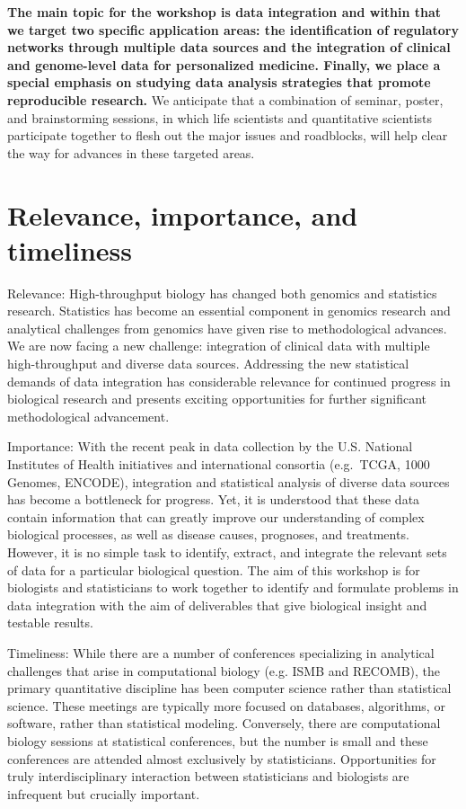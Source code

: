 \documentclass[12pt]{amsart}
\begin{document}
\textbf{The main topic for the workshop is data integration and within
  that we target two specific application areas: the identification of
  regulatory networks through multiple data sources and the
  integration of clinical and genome-level data for personalized
  medicine. Finally, we place a special emphasis on studying data
  analysis strategies that promote reproducible research.} We
anticipate that a combination of seminar, poster, and brainstorming
sessions, in which life scientists and quantitative scientists
participate together to flesh out the major issues and roadblocks,
will help clear the way for advances in these targeted areas.

\section*{Relevance, importance, and timeliness}

Relevance: High-throughput biology has changed both genomics and
statistics research. Statistics has become an essential component in
genomics research and analytical challenges from genomics have given
rise to methodological advances.  We are now facing a new challenge:
integration of clinical data with multiple high-throughput and diverse
data sources. Addressing the new statistical demands of data
integration has considerable relevance for continued progress in
biological research and presents exciting opportunities for further
significant methodological advancement.

Importance: With the recent peak in data collection by the
U.S. National Institutes of Health initiatives and international
consortia (e.g.\ TCGA, 1000 Genomes, ENCODE), integration and
statistical analysis of diverse data sources has become a bottleneck
for progress. Yet, it is understood that these data contain
information that can greatly improve our understanding of complex
biological processes, as well as disease causes, prognoses, and
treatments. However, it is no simple task to identify, extract, and
integrate the relevant sets of data for a particular biological
question. The aim of this workshop is for biologists and statisticians
to work together to identify and formulate problems in data
integration with the aim of deliverables that give biological insight
and testable results.

Timeliness: While there are a number of conferences specializing in
analytical challenges that arise in computational biology (e.g. ISMB
and RECOMB), the primary quantitative discipline has been computer
science rather than statistical science.  These meetings are typically
more focused on databases, algorithms, or software, rather than
statistical modeling. Conversely, there are computational biology sessions
at statistical conferences, but the number is small and these conferences are
attended almost exclusively by statisticians.  Opportunities for truly
interdisciplinary interaction between statisticians and biologists are
infrequent but crucially important.
\end{document}
